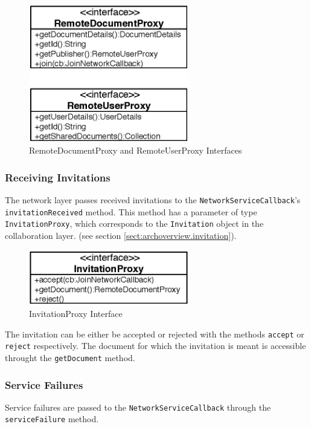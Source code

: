 \begin{figure}[H]
 \centering
 \includegraphics[width=6.99cm,height=6.00cm]{../images/finalreport/architecture_userdocumentproxy_uml.eps}
 \caption{RemoteDocumentProxy and RemoteUserProxy Interfaces}
 \label{fig:archoverview.userdocumentproxy}
\end{figure}


\subsubsection{Receiving Invitations}
The network layer passes received invitations to the 
\texttt{Network\-Service\-Callback}'s \texttt{invitation\-Received} method.
This method has a parameter of type \texttt{Invitation\-Proxy}, which 
corresponds to the \texttt{Invitation} object in the collaboration layer.
(see section \ref{sect:archoverview.invitation}).

\begin{figure}[H]
 \centering
 \includegraphics[width=6.99cm,height=2.40cm]{../images/finalreport/architecture_invitationproxy_uml.eps}
 \caption{InvitationProxy Interface}
\end{figure}

The invitation can be either be accepted or rejected with the methods
\texttt{accept} or \texttt{reject} respectively. The document for which
the invitation is meant is accessible throught the \texttt{get\-Document}
method.


\subsubsection{Service Failures}
Service failures are passed to the \texttt{Network\-Service\-Callback} through
the \texttt{service\-Failure} method.


